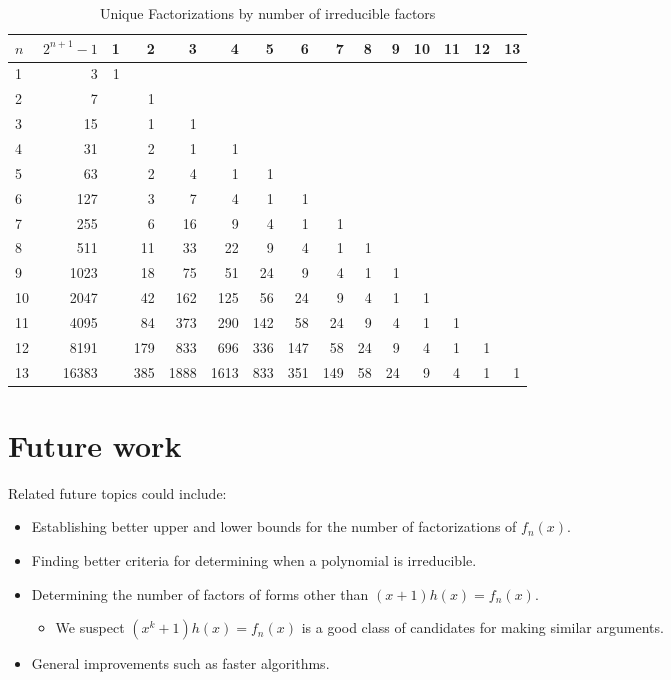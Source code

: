 \documentclass{article}
\begin{document}
    \begin{table}[!h]
    \centering
    \caption{Unique Factorizations by number of irreducible factors}
    \label{tab:data}
    \begin{tabular}{|l|*{14}{r|}}
        \hline
        $n$  & $2^{n+1}-1$ & 1 & 2 & 3 & 4 & 5 & 6 & 7 & 8 & 9 & 10 & 11 & 12 & 13 \\
        \hline
        1  & 3 & 1 & & & & & & & & & & & & \\
        \hline
        2  & 7 & & 1 & & & & & & & & & & & \\
        \hline
        3  & 15 & & 1 & 1 & & & & & & & & & & \\
        \hline
        4  & 31 & & 2 & 1 & 1 & & & & & & & & & \\
        \hline
        5  & 63 & & 2 & 4 & 1 & 1 & & & & & & & & \\
        \hline
        6  & 127 & & 3 & 7 & 4 & 1 & 1 & & & & & & & \\
        \hline
        7  & 255 & & 6 & 16 & 9 & 4 & 1 & 1 & & & & & & \\
        \hline
        8  & 511 & & 11 & 33 & 22 & 9 & 4 & 1 & 1 & & & & & \\
        \hline
        9  & 1023 & & 18 & 75 & 51 & 24 & 9 & 4 & 1 & 1 & & & & \\
        \hline
        10  & 2047 & & 42 & 162 & 125 & 56 & 24 & 9 & 4 & 1 & 1 & & & \\
        \hline
        11 & 4095 & & 84 & 373 & 290 & 142 & 58 & 24 & 9 & 4 & 1 & 1 & & \\
        \hline
        12 & 8191 & & 179 & 833 & 696 & 336 & 147 & 58 & 24 & 9 & 4 & 1 & 1 & \\
        \hline
        13 & 16383 & & 385 & 1888 & 1613 & 833 & 351 & 149 & 58 & 24 & 9 & 4 & 1 & 1 \\
        \hline
    \end{tabular}
\end{table}

\pagebreak
\section{Future work}
Related future topics could include:
\begin{itemize}
    \item Establishing better upper and lower bounds for the number of factorizations of $f_n(x)$.
    \item Finding better criteria for determining when a polynomial is irreducible.
    \item Determining the number of factors of forms other than $(x + 1)h(x) = f_n(x)$.
    
    \begin{itemize}
        \item We suspect $(x^k + 1)h(x) = f_n(x)$ is a good class of candidates for making similar arguments.
    \end{itemize}
    \item General improvements such as faster algorithms.
\end{itemize}
\end{document}
